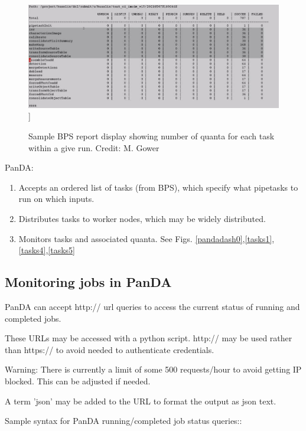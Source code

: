 \documentclass[DM,authoryear,toc]{lsstdoc}
\begin{document}
\begin{enumerate}
\begin{figure}
\includegraphics[width=\textwidth]{bpsreport.jpg}]
\caption{Sample BPS report display showing number of quanta for each task within a give run.
Credit: M. Gower}
\label{bpsreport}
\end{figure}


\end{enumerate}

PanDA:

\begin{enumerate}

\item Accepts an ordered list of tasks (from BPS), which specify what
pipetasks to run on which inputs.

\item Distributes tasks to worker nodes, which may be widely distributed.

\item Monitors tasks and associated quanta. 
See Figs. \ref{pandadash0},\ref{tasks1},\ref{tasks4},\ref{tasks5}

\end{enumerate}

\subsection{Monitoring jobs in PanDA} 

PanDA can accept http:// url queries to access the current status of running and completed jobs.

These URLs may be accessed with a python script.  http:// may be used rather than https:// to avoid
needed to authenticate credentials.

Warning: There is currently a limit of some 500 requests/hour to avoid getting IP blocked.
This can be adjusted if needed.

A term 'json' may be added to the URL to format the output as json text.

Sample syntax for PanDA running/completed job status queries::
\end{document}
